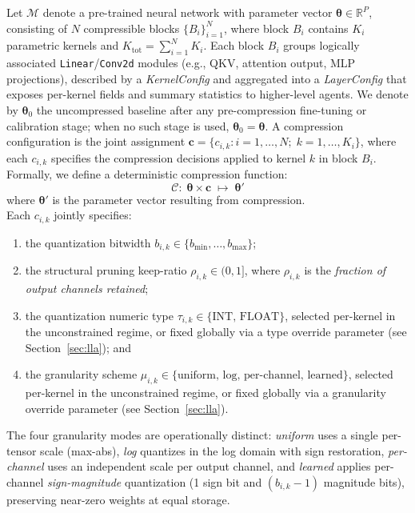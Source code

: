 \documentclass[preprint,12pt,authoryear]{elsarticle}
\begin{document}
Let $\mathcal{M}$ denote a pre-trained neural network with parameter vector
$\boldsymbol{\theta} \in \mathbb{R}^P$, consisting of $N$ compressible blocks
$\{B_i\}_{i=1}^N$, where block $B_i$ contains $K_i$ parametric kernels and
$K_{\mathrm{tot}}=\sum_{i=1}^{N}K_i$. Each block $B_i$ groups
logically associated \texttt{Linear}/\texttt{Conv2d} modules (e.g., QKV, attention
output, MLP projections), described by a \textit{KernelConfig} and aggregated into a
\textit{LayerConfig} that exposes per-kernel fields and summary statistics to higher-level
agents. We denote by $\boldsymbol{\theta}_0$ the uncompressed baseline after any
pre-compression fine-tuning or calibration stage; when no such stage is used,
$\boldsymbol{\theta}_0=\boldsymbol{\theta}$. A compression configuration is the joint assignment
$\mathbf{c} = \{c_{i,k}: i=1,\ldots,N;\; k=1,\ldots,K_i\}$, where each $c_{i,k}$ specifies the
compression decisions applied to kernel $k$ in block $B_i$. Formally, we define a
deterministic compression function:
\begin{equation}
    \mathcal{C}:\; \boldsymbol{\theta} \times \mathbf{c} \;\mapsto \; \boldsymbol{\theta}'
    \label{eq:compression_function}
\end{equation}
where $\boldsymbol{\theta}'$ is the parameter vector resulting from compression.\\
\noindent Each $c_{i,k}$ jointly specifies:
\begin{enumerate}[label=(\roman*)]
    \item the quantization bitwidth $b_{i,k} \in \{b_{\min}, \ldots, b_{\max}\}$;
    \item the structural pruning keep-ratio $\rho_{i,k} \in (0, 1]$, where $\rho_{i,k}$
          is the \emph{fraction of output channels retained};
    \item the quantization numeric type $\tau_{i,k} \in \{\mathrm{INT},\,\mathrm{FLOAT}\}$,
          selected per-kernel in the unconstrained regime, or fixed globally via a type
          override parameter (see Section~\ref{sec:lla}); and
    \item the granularity scheme
          $\mu_{i,k} \in \{\text{uniform},\,\text{log},\,\text{per-channel},\,\text{learned}\}$,
          selected per-kernel in the unconstrained regime, or fixed globally via a
          granularity override parameter (see Section~\ref{sec:lla}).
\end{enumerate}

\noindent The four granularity modes are operationally distinct: \textit{uniform} uses a
single per-tensor scale (max-abs), \textit{log} quantizes in the log domain with sign
restoration, \textit{per-channel} uses an independent scale per output channel, and
\textit{learned} applies per-channel \emph{sign-magnitude} quantization (1 sign bit and
$(b_{i,k}-1)$ magnitude bits), preserving near-zero weights at equal storage.
\end{document}
